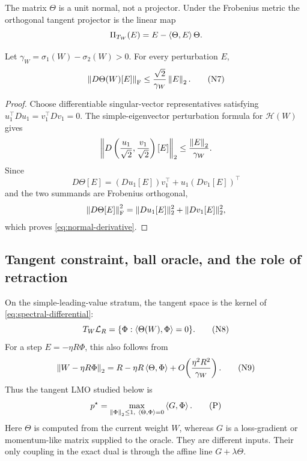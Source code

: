 \begin{remark}
The matrix \(\Theta\) is a unit normal, not a projector.  Under the Frobenius metric the
orthogonal tangent projector is the linear map
\[
 \Pi_{T_W}(E)=E-\left\langle \Theta,E\right\rangle\Theta.
\]
\end{remark}

\begin{lemma}
\label{lem:normal-derivative}
Let \(\gamma_W=\sigma_1(W)-\sigma_2(W)>0\).  For every perturbation \(E\),
\begin{equation}
 \left\lVert D\Theta(W)[E]\right\rVert_{\mathrm F}
 \le
 \frac{\sqrt2}{\gamma_W}\left\lVert E\right\rVert_{2}.
\tag{N7}
\label{eq:normal-derivative}
\end{equation}
\end{lemma}

\begin{proof}
Choose differentiable singular-vector representatives satisfying
\(u_1^\top Du_1=v_1^\top Dv_1=0\).  The simple-eigenvector perturbation
 formula for \(\mathcal H(W)\) gives
\[
 \left\|D\left(\frac{u_1}{\sqrt2},\frac{v_1}{\sqrt2}\right)[E]\right\|_2
 \le \frac{\left\lVert E\right\rVert_{2}}{\gamma_W}.
\]
Since
\[
 D\Theta[E]=(Du_1[E])v_1^\top+u_1(Dv_1[E])^\top
\]
and the two summands are Frobenius orthogonal,
\[
 \left\lVert D\Theta[E]\right\rVert_{\mathrm F}^2
 =\|Du_1[E]\|_2^2+\|Dv_1[E]\|_2^2,
\]
which proves \eqref{eq:normal-derivative}.
\end{proof}

\subsection{Tangent constraint, ball oracle, and the role of retraction}

On the simple-leading-value stratum, the tangent space is the kernel of
\eqref{eq:spectral-differential}:
\begin{equation}
 T_W\mathcal L_R
 =
 \{\Phi:\left\langle \Theta(W),\Phi\right\rangle=0\}.
\tag{N8}
\label{eq:true-tangent-space}
\end{equation}
For a step \(E=-\eta R\Phi\), this also follows from
\begin{equation}
 \left\lVert W-\eta R\Phi\right\rVert_{2}
 =
 R-\eta R\left\langle \Theta,\Phi\right\rangle
 +O\!\left(\frac{\eta^2R^2}{\gamma_W}\right).
\tag{N9}
\end{equation}
Thus the tangent LMO studied below is
\begin{equation}
 p^\star
 =
 \max_{\left\lVert \Phi\right\rVert_{2}\le1,\ \left\langle \Theta,\Phi\right\rangle=0}
 \left\langle G,\Phi\right\rangle.
\tag{P}
\label{eq:normal-primal}
\end{equation}
Here \(\Theta\) is computed from the current weight \(W\), whereas \(G\) is a
loss-gradient or momentum-like matrix supplied to the oracle.  They are
different inputs.  Their only coupling in the exact dual is through the affine
line \(G+\lambda\Theta\).

